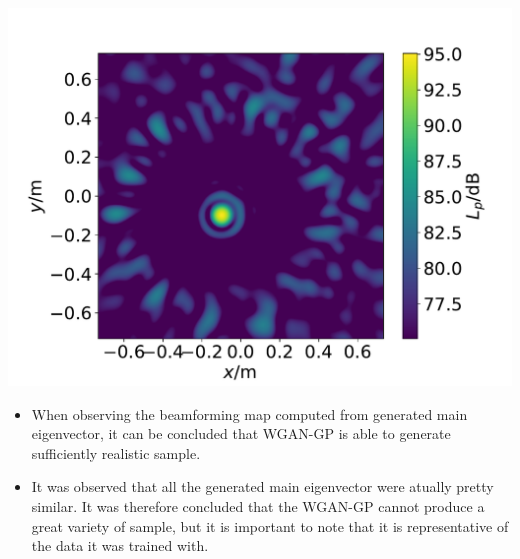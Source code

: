 \documentclass[12pt,pdftex,16x10]{elpres} %
\begin{document}
\begin{psli}
  
    \begin{minipage}[t][0.3\textheight][t]{0.4\textwidth}
      \centering
      \includegraphics[width=1.2\textwidth]{figs/beamforming_map_main_evec_wgangp_generated.pdf}
    \end{minipage}
    \begin{minipage}[b][0.7\textheight][t]{0.5\textwidth}
      \begin{itemize}
          \item When observing the beamforming map computed from generated main eigenvector, it can be concluded that WGAN-GP is able to generate sufficiently realistic sample.
          \item It was observed that all the generated main eigenvector were atually pretty similar. It was therefore concluded that the WGAN-GP cannot produce a great variety of sample, but it is important to note that it is representative of the data it was trained with.  
      \end{itemize}
    \end{minipage}
  \end{psli}
\end{document}
